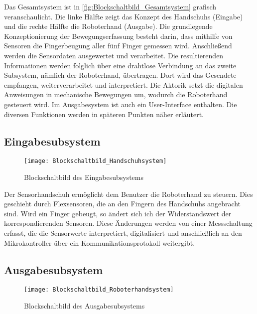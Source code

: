\documentclass[titlepage,12pt,twoside]{article}
\begin{document}
Das Gesamtsystem ist in \autoref{fig:Blockschaltbild_Gesamtsystem} grafisch veranschaulicht. Die linke Hälfte zeigt das Konzept des 
Handschuhs (Eingabe) und die rechte Hälfte die Roboterhand (Ausgabe). Die grundlegende Konzeptionierung der Bewegungserfassung 
besteht darin, dass mithilfe von Sensoren die Fingerbeugung aller fünf Finger gemessen wird. Anschließend werden die Sensordaten
ausgewertet und verarbeitet. Die resultierenden Informationen werden folglich über eine drahtlose Verbindung an das zweite 
Subsystem, nämlich der Roboterhand, übertragen. Dort wird das Gesendete empfangen, weiterverarbeitet und interpretiert. Die Aktorik
setzt die digitalen Anweisungen in mechanische Bewegungen um, wodurch die Roboterhand gesteuert wird. Im Ausgabesystem ist auch 
ein User-Interface enthalten. Die diversen Funktionen werden in späteren Punkten näher erläutert.

\subsection{Eingabesubsystem}

	\begin{figure}[H]
		\begin{center}
			\scalebox{0.8}
			{\texttt{[image: Blockschaltbild\_Handschuhsystem]}}
			\caption{Blockschaltbild des Eingabesubsystems}
			\label{fig:Blockschaltbild_Handschuhsystem}			
		\end{center}
	\end{figure}

Der Sensorhandschuh ermöglicht dem Benutzer die Roboterhand zu steuern. Dies geschieht durch Flexsensoren, die an den Fingern des 
Handschuhs angebracht sind. Wird ein Finger gebeugt, so ändert sich ich der Widerstandswert der korrespondierenden Sensoren. Diese Änderungen 
werden von einer Messschaltung erfasst, die die Sensorwerte interpretiert, digitalisiert und anschließlich an den Mikrokontroller über ein 
Kommunikationsprotokoll weitergibt. \\

\subsection{Ausgabesubsystem}

\begin{figure}[H]
	\begin{center}
		\scalebox{0.8}
		{\texttt{[image: Blockschaltbild\_Roboterhandsystem]}}
		\caption{Blockschaltbild des Ausgabesubsystems}
		\label{fig:Blockschaltbild_Roboterhandsystem}		
	\end{center}
\end{figure}
\end{document}
